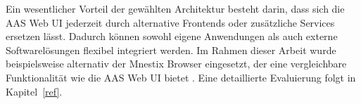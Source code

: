 
Ein wesentlicher Vorteil der gewählten Architektur besteht darin, dass sich die AAS Web UI jederzeit durch alternative Frontends oder zusätzliche Services ersetzen lässt.
Dadurch können sowohl eigene Anwendungen als auch externe Softwarelösungen flexibel integriert werden.
Im Rahmen dieser Arbeit wurde beispielsweise alternativ der Mnestix Browser eingesetzt, der eine vergleichbare Funktionalität wie die AAS Web UI bietet \cite{Quelle}.
Eine detaillierte Evaluierung  folgt in Kapitel~\ref{ref}.





